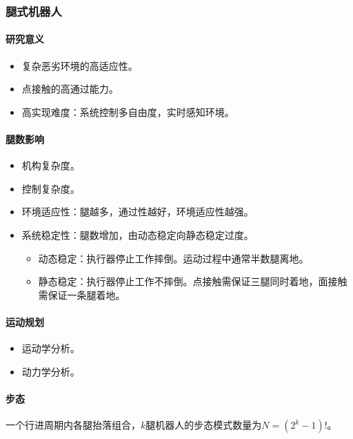 \documentclass[
12pt, %
a4paper, 
oneside, %
headinclude,footinclude, %
]{scrartcl}
\begin{document}
\subsubsection{腿式机器人}
\paragraph{研究意义}
\begin{itemize}
\item 复杂恶劣环境的高适应性。
\item 点接触的高通过能力。
\item 高实现难度：系统控制多自由度，实时感知环境。
\end{itemize}
\paragraph{腿数影响}
\begin{itemize}
\item 机构复杂度。
\item 控制复杂度。
\item 环境适应性：腿越多，通过性越好，环境适应性越强。
\item 系统稳定性：腿数增加，由动态稳定向静态稳定过度。
\begin{itemize}
\item 动态稳定：执行器停止工作摔倒。运动过程中通常半数腿离地。
\item 静态稳定：执行器停止工作不摔倒。点接触需保证三腿同时着地，面接触需保证一条腿着地。
\end{itemize}
\end{itemize}
\paragraph{运动规划}
\begin{itemize}
\item 运动学分析。
\item 动力学分析。
\end{itemize}
\paragraph{步态}
一个行进周期内各腿抬落组合，$ k $腿机器人的步态模式数量为$ N = (2^k - 1)! $。
\end{document}
